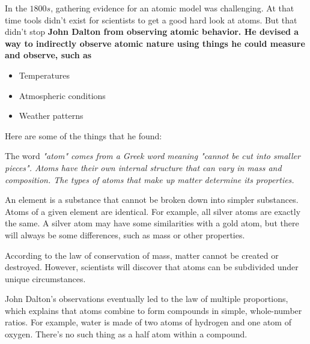 
In the $1800s$, gathering evidence for an atomic model was challenging. At that time tools didn't exist for scientists to get a good hard look at atoms. But that didn't stop \bf{John Dalton} from observing atomic behavior.
He devised a way to indirectly observe atomic nature using things he could measure and observe, such as

\begin{itemize}
    \item Temperatures
    \item Atmospheric conditions
    \item Weather patterns
\end{itemize}

Here are some of the things that he found:

\begin{definition}
    The word \it{"atom"} comes from a Greek word meaning \it{"cannot be cut into smaller pieces"}. Atoms have their own internal structure that can vary in mass and composition. The types of atoms that make up matter determine its properties.
\end{definition}

\begin{definition}
    An element is a substance that cannot be broken down into simpler substances.
    Atoms of a given element are identical. For example, all silver atoms are exactly the same.
    A silver atom may have some similarities with a gold atom, but there will always be some differences, such as mass or other properties.
\end{definition}

\begin{definition}
    According to the law of conservation of mass, matter cannot be created or destroyed. However, scientists will discover that atoms can be subdivided under unique circumstances.
\end{definition}

\begin{definition}
    John Dalton's observations eventually led to the law of multiple proportions, which explains that atoms combine to form compounds in simple, whole-number ratios. For example, water is made of two atoms of hydrogen and one atom of oxygen. There's no such thing as a half atom within a compound.
\end{definition}


